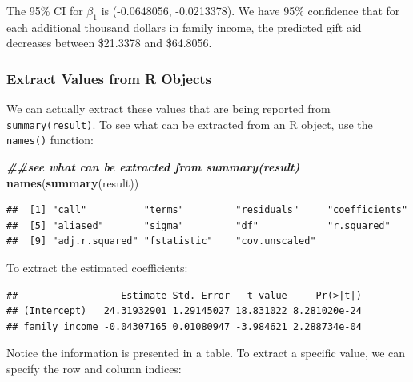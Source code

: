 \documentclass[
]{book}
\newenvironment{Shaded}{\begin{snugshade}}{\end{snugshade}}
\newcommand{\DocumentationTok}[1]{\textcolor[rgb]{0.56,0.35,0.01}{\textbf{\textit{#1}}}}
\newcommand{\FunctionTok}[1]{\textcolor[rgb]{0.13,0.29,0.53}{\textbf{#1}}}
\newcommand{\NormalTok}[1]{#1}
\newcommand{\SpecialCharTok}[1]{\textcolor[rgb]{0.81,0.36,0.00}{\textbf{#1}}}
\begin{document}
The 95\% CI for \(\beta_1\) is (-0.0648056, -0.0213378). We have 95\% confidence that for each additional thousand dollars in family income, the predicted gift aid decreases between \$21.3378 and \$64.8056.

\hypertarget{extract-values-from-r-objects}{%
\subsubsection*{Extract Values from R Objects}\label{extract-values-from-r-objects}}

We can actually extract these values that are being reported from \texttt{summary(result)}. To see what can be extracted from an R object, use the \texttt{names()} function:

\begin{Shaded}
\begin{Highlighting}[]
\DocumentationTok{\#\#see what can be extracted from summary(result)}
\FunctionTok{names}\NormalTok{(}\FunctionTok{summary}\NormalTok{(result))}
\end{Highlighting}
\end{Shaded}

\begin{verbatim}
##  [1] "call"          "terms"         "residuals"     "coefficients" 
##  [5] "aliased"       "sigma"         "df"            "r.squared"    
##  [9] "adj.r.squared" "fstatistic"    "cov.unscaled"
\end{verbatim}

To extract the estimated coefficients:

\begin{Shaded}
\end{Shaded}

\begin{verbatim}
##                  Estimate Std. Error   t value     Pr(>|t|)
## (Intercept)   24.31932901 1.29145027 18.831022 8.281020e-24
## family_income -0.04307165 0.01080947 -3.984621 2.288734e-04
\end{verbatim}

Notice the information is presented in a table. To extract a specific value, we can specify the row and column indices:
\end{document}
